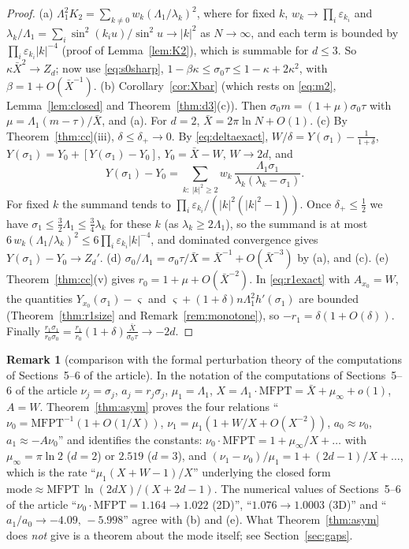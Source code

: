 \documentclass[11pt,a4paper]{article}
\newcommand{\Xb}{\bar X}
\theoremstyle{plain}
\theoremstyle{definition}
\newtheorem{remark}[theorem]{Remark}
\numberwithin{equation}{section}
\begin{document}
\begin{proof}
(a) $\Lambda_1^2K_2=\sum_{k\ne0}w_k(\Lambda_1/\lambda_k)^2$, where for fixed $k$, $w_k\to\prod_i\varepsilon_{k_i}$ and $\lambda_k/\Lambda_1=\sum_i\sin^2(k_iu)/\sin^2u\to|k|^2$ as $N\to\infty$, and each term is bounded by $\prod_i\varepsilon_{k_i}|k|^{-4}$ (proof of Lemma~\ref{lem:K2}), which is summable for $d\le3$. So $\kappa\Xb^2\to Z_d$; now use \eqref{eq:s0sharp}, $1-\beta\kappa\le\sigma_0\tau\le1-\kappa+2\kappa^2$, with $\beta=1+O(\Xb^{-1})$.
(b) Corollary~\ref{cor:Xbar} (which rests on \eqref{eq:m2}, Lemma~\ref{lem:closed} and Theorem~\ref{thm:d3}(c)). Then $\sigma_0m=(1+\mu)\sigma_0\tau$ with $\mu=\Lambda_1(m-\tau)/\Xb$, and (a). For $d=2$, $\Xb=2\pi\ln N+O(1)$.
(c) By Theorem~\ref{thm:cc}(iii), $\delta\le\delta_+\to0$. By \eqref{eq:deltaexact}, $W/\delta=Y(\sigma_1)-\frac{1}{1+\delta}$, $Y(\sigma_1)=Y_0+[Y(\sigma_1)-Y_0]$, $Y_0=\Xb-W$, $W\to2d$, and
\[
Y(\sigma_1)-Y_0=\sum_{k:\ |k|^2\ge2}w_k\,\frac{\Lambda_1\sigma_1}{\lambda_k(\lambda_k-\sigma_1)} .
\]
For fixed $k$ the summand tends to $\prod_i\varepsilon_{k_i}/(|k|^2(|k|^2-1))$. Once $\delta_+\le\frac12$ we have $\sigma_1\le\frac32\Lambda_1\le\frac34\lambda_k$ for these $k$ (as $\lambda_k\ge2\Lambda_1$), so the summand is at most $6\,w_k(\Lambda_1/\lambda_k)^2\le6\prod_i\varepsilon_{k_i}|k|^{-4}$, and dominated convergence gives $Y(\sigma_1)-Y_0\to Z_d'$.
(d) $\sigma_0/\Lambda_1=\sigma_0\tau/\Xb=\Xb^{-1}+O(\Xb^{-3})$ by (a), and (c).
(e) Theorem~\ref{thm:cc}(v) gives $r_0=1+\mu+O(\Xb^{-2})$. In \eqref{eq:r1exact} with $A_{x_0}=W$, the quantities $Y_{x_0}(\sigma_1)-\varsigma$ and $\varsigma+(1+\delta)n\Lambda_1^2h'(\sigma_1)$ are bounded (Theorem~\ref{thm:r1size} and Remark~\ref{rem:monotone}), so $-r_1=\delta(1+O(\delta))$. Finally $\frac{r_1\sigma_1}{r_0\sigma_0}=\frac{r_1}{r_0}(1+\delta)\frac{\Xb}{\sigma_0\tau}\to-2d$.
\end{proof}

\begin{remark}[comparison with the formal perturbation theory of the computations of Sections~5--6 of the article]\label{rem:floatstudy}
In the notation of the computations of Sections~5--6 of the article $\nu_j=\sigma_j$, $a_j=r_j\sigma_j$, $\mu_1=\Lambda_1$, $X=\Lambda_1\cdot\mathrm{MFPT}=\Xb+\mu_\infty+o(1)$, $A=W$. Theorem~\ref{thm:asym} proves the four relations
``$\nu_0=\mathrm{MFPT}^{-1}(1+O(1/X))$, $\nu_1=\mu_1(1+W/X+O(X^{-2}))$, $a_0\approx\nu_0$, $a_1\approx-A\nu_0$'' and identifies the constants: $\nu_0\cdot\mathrm{MFPT}=1+\mu_\infty/X+\dots$ with $\mu_\infty=\pi\ln2$ ($d=2$) or $2.519$ ($d=3$), and $(\nu_1-\nu_0)/\mu_1=1+(2d-1)/X+\dots$, which is the rate ``$\mu_1(X+W-1)/X$'' underlying the closed form $\mathrm{mode}\approx\mathrm{MFPT}\,\ln(2dX)/(X+2d-1)$. The numerical values of Sections~5--6 of the article ``$\nu_0\cdot\mathrm{MFPT}=1.164\to1.022$ (2D)'', ``$1.076\to1.0003$ (3D)'' and ``$a_1/a_0\to-4.09,\,-5.998$'' agree with (b) and (e). What Theorem~\ref{thm:asym} does \emph{not} give is a theorem about the mode itself; see Section~\ref{sec:gaps}.
\end{remark}
\end{document}
